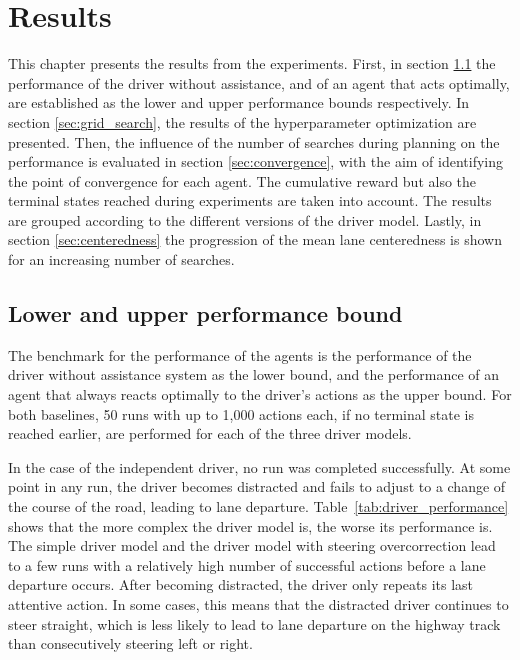 \chapter{Results}
\label{ch:results}

This chapter presents the results from the experiments. First, in section \ref{sec:perf_bounds} the performance of the driver without assistance, and of an agent that acts optimally, are established as the lower and upper performance bounds respectively. In section \ref{sec:grid_search}, the results of the hyperparameter optimization are presented. Then, the influence of the number of searches during planning  on the performance is evaluated in section \ref{sec:convergence}, with the aim of identifying the point of convergence for each agent. The cumulative reward but also the terminal states reached during experiments are taken into account. The results are grouped according to the different versions of the driver model. Lastly, in section \ref{sec:centeredness} the progression of the mean lane centeredness is shown for an increasing number of searches.

\section{Lower and upper performance bound}
\label{sec:perf_bounds}

The benchmark for the performance of the agents is the performance of the driver without assistance system as the lower bound, and the performance of an agent that always reacts optimally to the driver's actions as the upper bound. For both baselines, 50 runs with up to 1,000 actions each, if no terminal state is reached earlier, are performed for each of the three driver models. 

In the case of the independent driver, no run was completed successfully. At some point in any run, the driver becomes distracted and fails to adjust to a change of the course of the road, leading to lane departure. Table~\ref{tab:driver_performance} shows that the more complex the driver model is, the worse its performance is. The simple driver model and the driver model with steering overcorrection lead to a few runs with a relatively high number of successful actions before a lane departure occurs. After becoming distracted, the driver only repeats its last attentive action. In some cases, this means that the distracted driver continues to steer straight, which is less likely to lead to lane departure on the highway track than consecutively steering left or right.

